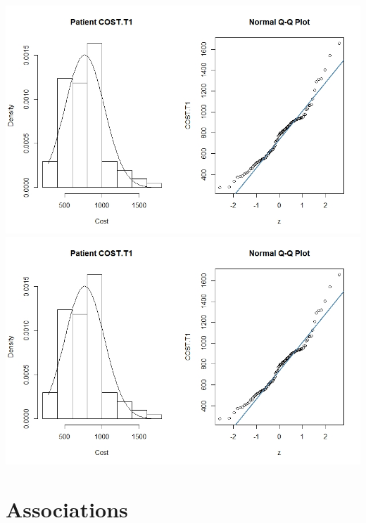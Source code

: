 \documentclass[11pt]{article}
\begin{document}
\includegraphics[width=15cm]{RStudio/jpeg/Norm T1.jpeg}
\includegraphics[width=15cm]{RStudio/jpeg/Norm T1.jpeg}


\section{Associations}
\end{document}
